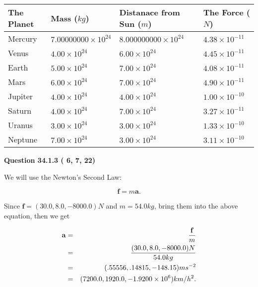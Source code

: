 \documentclass[12pt]{article}
\begin{document}
 
\begin{tabular}{|l|l|l|l|}
\hline
The Planet & Mass ($kg$) & Distanace from Sun ($m$) & The Force ($N$)\\
\hline
Mercury  &
           $ %
7.00000000 \times 10^{24} $   &
             $ %
8.000000000 \times 10^{24} $    & $ %
4.38 \times 10^{-11} $
\\  \hline
Venus    &
           $  %
4.00 \times 10^{24}  $     &
             $ %
6.00 \times 10^{24} $    & $ %
4.45 \times 10^{-11} $
\\  \hline
Earth    &
           $  %
5.00 \times 10^{24}  $     &
             $ %
7.00 \times 10^{24} $    & $ %
4.08 \times 10^{-11} $
\\   \hline
Mars     &
           $  %
6.00 \times 10^{24} $     &
             $ %
7.00 \times 10^{24} $    & $ %
4.90 \times 10^{-11} $
\\   \hline
Jupiter  &
           $  %
4.00 \times 10^{24} $    &
             $ %
4.00 \times 10^{24} $    & $ %
1.00 \times 10^{-10} $
\\  \hline
Saturn   &
           $  %
4.00 \times 10^{24} $    &
             $ %
7.00 \times 10^{24}  $    & $ %
3.27 \times 10^{-11} $
\\  \hline
Uranus   &
           $  %
3.00 \times 10^{24} $    &
             $ %
3.00 \times 10^{24} $    & $ %
1.33 \times 10^{-10} $
\\  \hline
Neptune  &
           $  %
7.00 \times 10^{24} $    &
             $ %
3.00 \times 10^{24} $    & $ %
3.11 \times 10^{-10} $
\\  \hline
 
\end{tabular}
 
 
 
 
  
\vspace{0.2in}
  
{\textbf{\Large{Question
34.1.3 
 (          6,          7,         22)
}}}
  
  
 
 

We will use the Newton's Second Law:
 
\[
\mathbf{f}=m\mathbf{a}.
\]
 
Since $\mathbf{f}=( %
30.0,  %
8.0,  %
-8000.0 )N$
and $m= %
54.0 kg$, bring them into the above equation, then we get
 
\begin{eqnarray*}
\mathbf{a}&=&\frac{\mathbf{f}}m  \\
&=&\frac{(
30.0 ,
8.0 ,
-8000.0 )N
}{ %
54.0 kg}  \\
&=&(
.55556 ,
.14815,
-148.15
)ms^{-2} \\
&=&(
7200.0 ,
1920.0 ,
-1.9200 \times 10^{6}
)km/h^2.
\end{eqnarray*}
 
\end{document}
